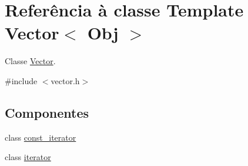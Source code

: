 \hypertarget{class_vector}{}\section{Referência à classe Template Vector$<$ Obj $>$}
\label{class_vector}


Classe \hyperlink{class_vector}{Vector}.  




{\ttfamily \#include $<$vector.\+h$>$}

\subsection*{Componentes}
\begin{DoxyCompactItemize}
\item 
class \hyperlink{class_vector_1_1const__iterator}{const\+\_\+iterator}
\item 
class \hyperlink{class_vector_1_1iterator}{iterator}
\end{DoxyCompactItemize}
